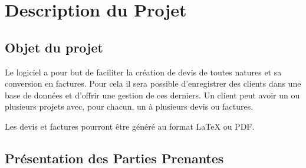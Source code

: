 \chapter{Description du Projet}
\section{Objet du projet}
Le logiciel a pour but de faciliter la création de devis de toutes natures et sa conversion en factures. Pour cela il sera possible d’enregistrer des clients dans une base de données et d’offrir une gestion de ces derniers. Un client peut avoir un ou plusieurs projets avec, pour chacun, un à plusieurs devis ou factures. 

Les devis et factures pourront être généré au format LaTeX ou PDF. 

\section{Présentation des Parties Prenantes}

